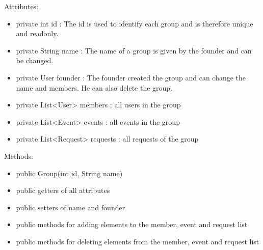 Attributes:
	\begin{itemize}
	\item private int id : The id is used to identify each group and is therefore unique and readonly.
	\item private String name : The name of a group is given by the founder and can be changed.
	\item private User founder : The founder created the group and can change the name and members. He can also delete the group.
	\item private List<User> members : all users in the group
	\item private List<Event> events : all events in the group
	\item private List<Request> requests  : all requests of the group
	
	\end{itemize}
	Methods:
	\begin{itemize}
	\item public Group(int id, String name)
	\item public getters of all attributes
	\item public setters of name and founder
	\item public methods for adding elements to the member, event and request list
	\item public methods for deleting elements from the member, event and request list
	\end{itemize}

\newpage

